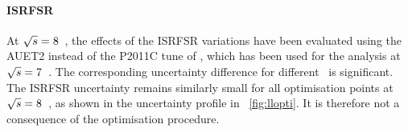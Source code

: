 \paragraph{\gls{ISRFSR}}\mbox{}
%
At ${\sqrt{s}}=8$~\TeV, the effects of the \gls{ISRFSR} variations have been evaluated using the AUET2 instead of the P2011C tune of \Pythiasix, which has been used for the analysis at ${\sqrt{s}}=7$~\TeV. 
%
The corresponding uncertainty difference for different \cmes\ is significant.
%
The \gls{ISRFSR} uncertainty remains similarly small for all optimisation points at ${\sqrt{s}}=8$~\TeV, as shown in the uncertainty profile in ~\ref{fig:llopti}. It is therefore not a consequence of the optimisation procedure. 
%
%
